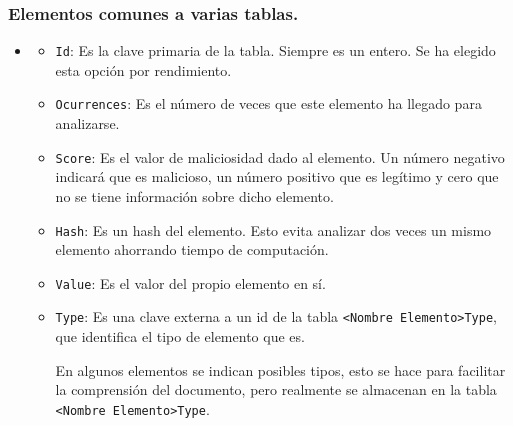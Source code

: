 \subsubsection{Elementos comunes a varias tablas.}
\begin{itemize}
    \item[] 
    \begin{itemize}
        \item \texttt{Id}: Es la clave primaria de la tabla. Siempre es un entero. Se ha elegido esta opción por rendimiento. 
        \item \texttt{Ocurrences}: Es el número de veces que este elemento ha llegado para analizarse.
        \item \texttt{Score}: Es el valor de maliciosidad dado al elemento. Un número negativo indicará que es malicioso, un número positivo que es legítimo y cero que no se tiene información sobre dicho elemento. 
        \item \texttt{Hash}: Es un hash del elemento. Esto evita analizar dos veces un mismo elemento ahorrando tiempo de computación.  
        \item \texttt{Value}: Es el valor del propio elemento en sí.
        \item \texttt{Type}: Es una clave externa a un id de la tabla \verb!<Nombre Elemento>Type!, que identifica el tipo de elemento que es. 
        
        En algunos elementos se indican posibles tipos, esto se hace para facilitar la comprensión del documento, pero realmente se almacenan en la tabla \verb!<Nombre Elemento>Type!.
    \end{itemize}
\end{itemize}

